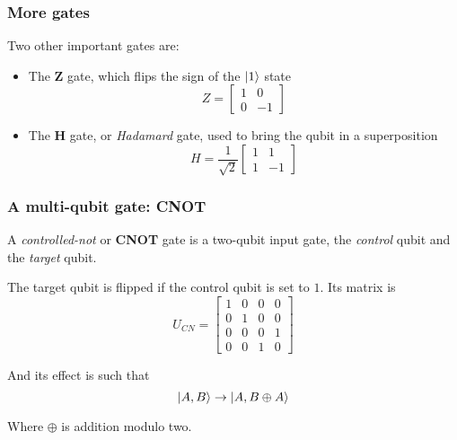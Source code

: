 \documentclass{beamer}
\begin{document}
  \begin{frame}
    \frametitle{More gates}
    Two other important gates are:
    \begin{itemize}
      \item The \textbf{Z} gate, which flips the sign of the $\ket{1}$ state
      \begin{equation*}
        Z = \begin{bmatrix}
          1 & 0 \\ 0 & -1
        \end{bmatrix}
      \end{equation*}
      \item The \textbf{H} gate, or \textit{Hadamard} gate, used to bring the qubit in a superposition
      \begin{equation*}
        H = \frac1{\sqrt 2}\begin{bmatrix}
          1 & 1 \\ 1 & -1
        \end{bmatrix}
      \end{equation*}
    \end{itemize}  
  \end{frame}
  \begin{frame}
    \frametitle{A multi-qubit gate: CNOT}
    A \textit{controlled-not} or \textbf{CNOT} gate is a two-qubit input gate, the \textit{control} qubit
    and the \textit{target} qubit.

    The target qubit is flipped if the control qubit is set to $1$. Its matrix is
    \begin{equation*}
      U_{CN} = \begin{bmatrix}
        1 & 0 & 0 & 0 \\
        0 & 1 & 0 & 0 \\
        0 & 0 & 0 & 1 \\
        0 & 0 & 1 & 0
      \end{bmatrix}
    \end{equation*}

    And its effect is such that
    \begin{equation*}
      \ket{A,B} \to \ket{A,B\oplus A}
    \end{equation*}

    Where $\oplus$ is addition modulo two.
  \end{frame}
\end{document}
